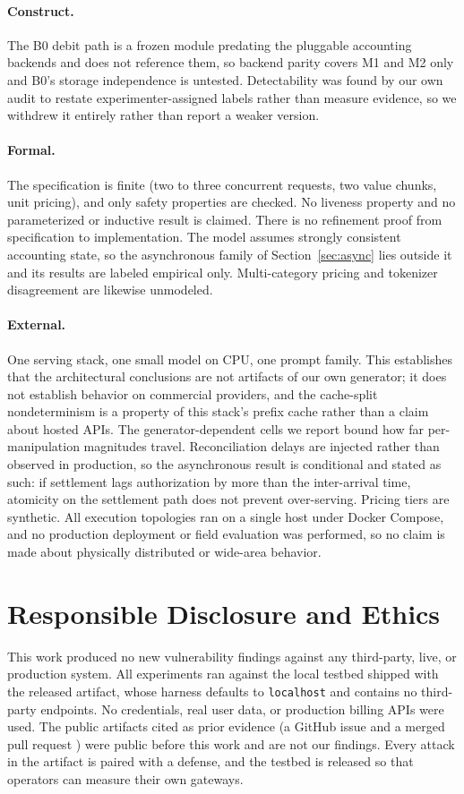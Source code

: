 \documentclass[preprint,3p,authoryear,12pt]{elsarticle}
\begin{document}
\paragraph{Construct.}
The B0 debit path is a frozen module predating the pluggable accounting backends and
does not reference them, so backend parity covers M1 and M2 only and B0's storage
independence is untested. Detectability was found by our own audit to restate
experimenter-assigned labels rather than measure evidence, so we withdrew it entirely
rather than report a weaker version.

\paragraph{Formal.}
The specification is finite (two to three concurrent requests, two value chunks, unit
pricing), and only safety properties are checked. No liveness property and no
parameterized or inductive result is claimed. There is no refinement proof from
specification to implementation. The model assumes strongly consistent accounting state,
so the asynchronous family of Section~\ref{sec:async} lies outside it and its results are
labeled empirical only. Multi-category pricing and tokenizer disagreement are likewise
unmodeled.

\paragraph{External.}
One serving stack, one small model on CPU, one prompt family. This establishes that the
architectural conclusions are not artifacts of our own generator; it does not establish
behavior on commercial providers, and the cache-split nondeterminism is a property of
this stack's prefix cache rather than a claim about hosted APIs. The generator-dependent
cells we report bound how far per-manipulation magnitudes travel. Reconciliation delays
are injected rather than observed in production, so the asynchronous result is
conditional and stated as such: if settlement lags authorization by more than the
inter-arrival time, atomicity on the settlement path does not prevent over-serving.
Pricing tiers are synthetic. All execution topologies ran on a single host under Docker
Compose, and no production deployment or field evaluation was performed, so no claim is
made about physically distributed or wide-area behavior.

\section{Responsible Disclosure and Ethics}
This work produced no new vulnerability findings against any third-party, live, or
production system. All experiments ran against the local testbed shipped with the
released artifact, whose harness defaults to \texttt{localhost} and contains no
third-party endpoints. No credentials, real user data, or production billing APIs were
used. The public artifacts cited as prior evidence (a GitHub issue \citep{newapi5235}
and a merged pull request \citep{aperture247}) were public before this work and are
not our findings. Every attack in the artifact is paired with a defense, and the testbed
is released so that operators can measure their own gateways.
\end{document}
